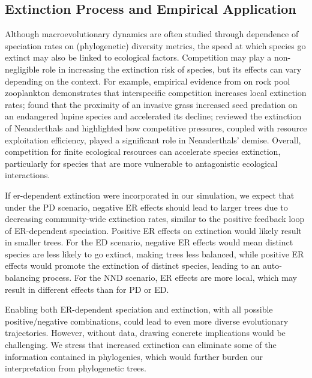 {\subsection{Extinction Process and Empirical Application}
\label{ch1::sec::discussion::}
Although macroevolutionary dynamics are often studied through dependence of speciation rates on (phylogenetic) diversity metrics, the speed at which species go extinct may also be linked to ecological factors. Competition may play a non-negligible role in increasing the extinction risk of species, but its effects can vary depending on the context. For example, empirical evidence from \citet{bengtsson_interspecific_1989} on rock pool zooplankton demonstrates that interspecific competition increases local extinction rates; \citet{dangremond_apparent_2010} found that the proximity of an invasive grass increased seed predation on an endangered lupine species and accelerated its decline; \citet{timmermann_quantifying_2020} reviewed the extinction of Neanderthals and highlighted how competitive pressures, coupled with resource exploitation efficiency, played a significant role in Neanderthals' demise. Overall, competition for finite ecological resources can accelerate species extinction, particularly for species that are more vulnerable to antagonistic ecological interactions. 

If \acrshort{er}-dependent extinction were incorporated in our simulation, we expect that under the PD scenario, negative ER effects should lead to larger trees due to decreasing community-wide extinction rates, similar to the positive feedback loop of ER-dependent speciation. Positive ER effects on extinction would likely result in smaller trees. For the ED scenario, negative ER effects would mean distinct species are less likely to go extinct, making trees less balanced, while positive ER effects would promote the extinction of distinct species, leading to an auto-balancing process. For the NND scenario, ER effects are more local, which may result in different effects than for PD or ED.

Enabling both ER-dependent speciation and extinction, with all possible positive/negative combinations, could lead to even more diverse evolutionary trajectories. However, without data, drawing concrete implications would be challenging. We stress that increased extinction can eliminate some of the information contained in phylogenies, which would further burden our interpretation from phylogenetic trees.

}
